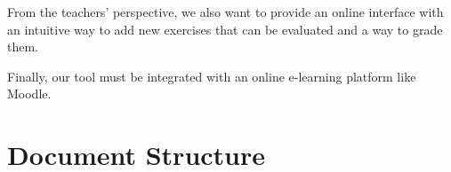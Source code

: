 From the teachers' perspective, we also want to provide an online interface with an intuitive way to add new exercises that can be evaluated and a way to grade them.

Finally, our tool must be integrated with an online e-learning platform like Moodle.
\section{Document Structure}






